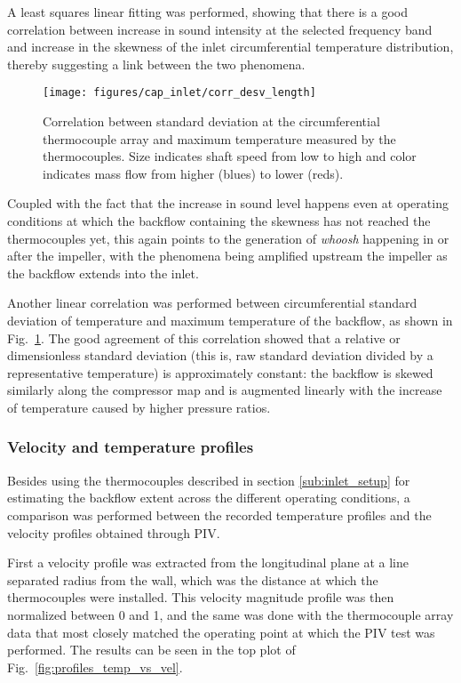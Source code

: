 A least squares linear fitting was performed, showing that there is a good correlation between increase in sound intensity at the selected frequency band and increase in the skewness of the inlet circumferential temperature distribution, thereby suggesting a link between the two phenomena.

\begin{figure}[htb!]
\centering
\texttt{[image: figures/cap\_inlet/corr\_desv\_length]}
\caption[Correlation between temp. $\sigma$ and backflow length]{Correlation between standard deviation at the circumferential thermocouple array and maximum temperature measured by the thermocouples. Size indicates shaft speed from low to high and color indicates mass flow from higher (blues) to lower (reds).}
\label{fig:corr2}
\end{figure}

Coupled with the fact that the increase in sound level happens even at operating conditions at which the backflow containing the skewness has not reached the thermocouples yet, this again points to the generation of \emph{whoosh} happening in or after the impeller, with the phenomena being amplified upstream the impeller as the backflow extends into the inlet.

Another linear correlation was performed between circumferential standard deviation of temperature and maximum temperature of the backflow, as shown in Fig.~\ref{fig:corr2}. The good agreement of this correlation showed that a relative or dimensionless standard deviation (this is, raw standard deviation divided by a representative temperature) is approximately constant: the backflow is skewed similarly along the compressor map and is augmented linearly with the increase of temperature caused by higher pressure ratios.

\subsubsection{Velocity and temperature profiles}

Besides using the thermocouples described in section \ref{sub:inlet_setup} for estimating the backflow extent across the different operating conditions, a comparison was performed between the recorded temperature profiles and the velocity profiles obtained through PIV.

First a velocity profile was extracted from the longitudinal plane at a line  separated  radius from the wall, which was the distance at which the thermocouples were installed. This velocity magnitude profile was then normalized between 0 and 1, and the same was done with the thermocouple array data that most closely matched the operating point at which the PIV test was performed. The results can be seen in the top plot of Fig.~\ref{fig:profiles_temp_vs_vel}.

